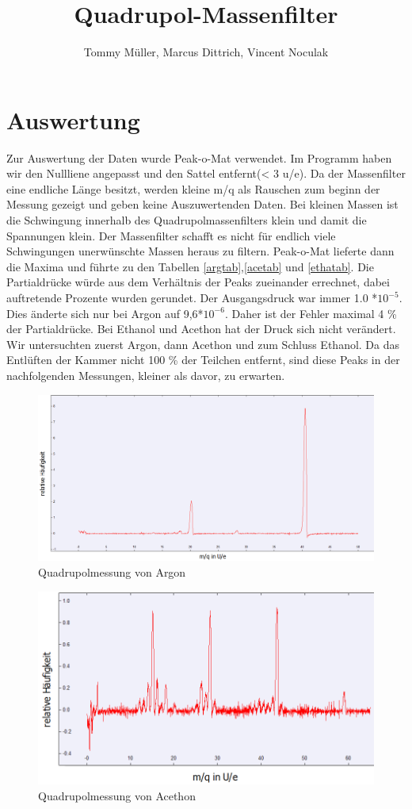 \documentclass[10pt,a4paper]{article}
\author{Tommy Müller, Marcus Dittrich, Vincent Noculak}
\title{Quadrupol-Massenfilter}
\begin{document}
\section{Auswertung}

Zur Auswertung der Daten wurde Peak-o-Mat verwendet. Im Programm haben wir den Nullliene angepasst und den Sattel entfernt(< 3 u/e). Da der Massenfilter eine endliche Länge besitzt, werden kleine m/q als Rauschen zum beginn der Messung gezeigt und geben keine Auszuwertenden Daten. Bei kleinen Massen ist die Schwingung innerhalb des Quadrupolmassenfilters klein und damit die Spannungen klein. Der Massenfilter schafft es nicht für endlich viele Schwingungen unerwünschte Massen heraus zu filtern. Peak-o-Mat lieferte dann die Maxima und führte zu den Tabellen \ref{argtab},\ref{acetab} und \ref{ethatab}. Die Partialdrücke würde aus dem Verhältnis der Peaks zueinander errechnet, dabei auftretende Prozente wurden gerundet. Der Ausgangsdruck war immer 1.0 *$10^{-5}$. Dies änderte sich nur bei Argon auf 9,6*$10^{-6}$. Daher ist der Fehler maximal 4 \% der Partialdrücke. Bei Ethanol und Acethon hat der Druck sich nicht verändert.
Wir untersuchten zuerst Argon, dann Acethon und zum Schluss Ethanol. Da das Entlüften der Kammer nicht 100 \% der Teilchen entfernt, sind diese Peaks in der nachfolgenden Messungen, kleiner als davor, zu erwarten. 


\begin{figure}[h]
	\includegraphics[scale = 0.2]{argon1.png}
	\centering
	\caption{Quadrupolmessung von Argon}
	\label{arg}
\end{figure}

\begin{figure}[h]
	\includegraphics[scale = 0.3]{acethon1.png}
	\centering
	\caption{Quadrupolmessung von Acethon}
	\label{arg}
\end{figure}
\end{document}
